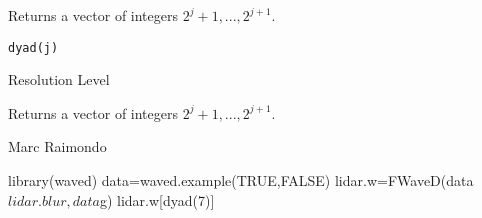 \begin{Description}\relax
Returns a vector of integers $2^j+1,...,2^{j+1}$.
\end{Description}
\begin{Usage}
\begin{verbatim}
dyad(j)
\end{verbatim}
\end{Usage}
\begin{Arguments}
\begin{ldescription}
\item[\code{j}] Resolution Level
\end{ldescription}
\end{Arguments}
\begin{Value}
Returns a vector of integers $2^j+1,...,2^{j+1}$.
\end{Value}
\begin{Author}\relax
Marc Raimondo
\end{Author}
\begin{SeeAlso}\relax
{}
\end{SeeAlso}
\begin{Examples}
\begin{ExampleCode}
library(waved)
data=waved.example(TRUE,FALSE)
lidar.w=FWaveD(data$lidar.blur,data$g)
lidar.w[dyad(7)]
\end{ExampleCode}
\end{Examples}

